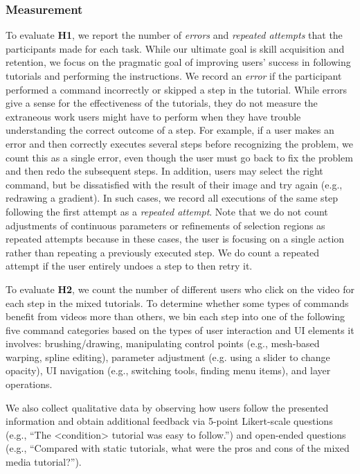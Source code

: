 \subsubsection{Measurement}
To evaluate \textbf{H1}, we report the number of \emph{errors} and \emph{repeated attempts} that the participants made for each task. While our ultimate goal is skill acquisition and retention, we focus on the pragmatic goal of improving users' success in following tutorials and performing the instructions. We record an \emph{error} if the participant performed a command incorrectly or skipped a step in the tutorial. While errors give a sense for the effectiveness of the tutorials, they do not measure the extraneous work users might have to perform when they have trouble understanding the correct outcome of a step. For example, if a user makes an error and then correctly executes several steps before recognizing the problem, we count this as a single error, even though the user must go back to fix the problem and then redo the subsequent steps. In addition, users may select the right command, but be dissatisfied with the result of their image and try again (e.g., redrawing a gradient). In such cases, we record all executions of the same step following the first attempt as a \emph{repeated attempt}. Note that we do not count adjustments of continuous parameters or refinements of selection regions as repeated attempts because in these cases, the user is focusing on a single action rather than repeating a previously executed step. We do count a repeated attempt if the user entirely undoes a step to then retry it.

To evaluate \textbf{H2}, we count the number of different users who click on the video for each step in the mixed tutorials. To determine whether some types of commands benefit from videos more than others, we bin each step into one of the following five command categories based on the types of user interaction and UI elements it involves: brushing/drawing, manipulating control points (e.g., mesh-based warping, spline editing), parameter adjustment (e.g. using a slider to change opacity), UI navigation (e.g., switching tools, finding menu items), and layer operations.

We also collect qualitative data by observing how users follow the presented information and obtain additional feedback via 5-point Likert-scale questions (e.g., ``The {\textless}condition{\textgreater} tutorial was easy to follow.'') and open-ended questions (e.g., ``Compared with static tutorials, what were the pros and cons of the mixed media tutorial?'').
